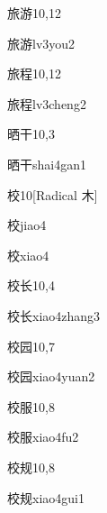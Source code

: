 \begin{entry}{旅游}{10,12}
  \begin{phonetics}{旅游}{lv3you2}
  \end{phonetics}
\end{entry}

\begin{entry}{旅程}{10,12}
  \begin{phonetics}{旅程}{lv3cheng2}
  \end{phonetics}
\end{entry}

\begin{entry}{晒干}{10,3}
  \begin{phonetics}{晒干}{shai4gan1}
  \end{phonetics}
\end{entry}

\begin{entry}{校}{10}[Radical 木]
  \begin{phonetics}{校}{jiao4}
  \end{phonetics}
  \begin{phonetics}{校}{xiao4}
  \end{phonetics}
\end{entry}

\begin{entry}{校长}{10,4}
  \begin{phonetics}{校长}{xiao4zhang3}
  \end{phonetics}
\end{entry}

\begin{entry}{校园}{10,7}
  \begin{phonetics}{校园}{xiao4yuan2}
  \end{phonetics}
\end{entry}

\begin{entry}{校服}{10,8}
  \begin{phonetics}{校服}{xiao4fu2}
  \end{phonetics}
\end{entry}

\begin{entry}{校规}{10,8}
  \begin{phonetics}{校规}{xiao4gui1}
  \end{phonetics}
\end{entry}

